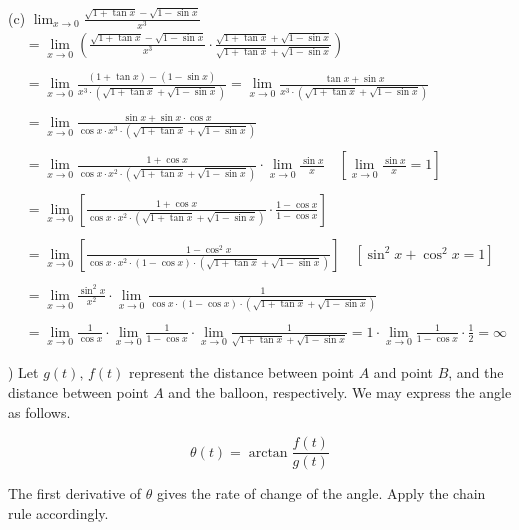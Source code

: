 \documentclass{article}
\begin{document}
\noindent (c) $\displaystyle\lim_{x\to0}\frac{\sqrt{1+\tan x}-\sqrt{1-\sin x}}{x^3}$
\begin{align*}
&=\lim_{x\to0}\left(\frac{\sqrt{1+\tan x}-\sqrt{1-\sin x}}{x^3}\cdot\frac{\sqrt{1+\tan x}+\sqrt{1-\sin x}}{\sqrt{1+\tan x}+\sqrt{1-\sin x}}\right)\\\\&=\lim_{x\to0}\frac{(1+\tan x)-(1-\sin x)}{x^3\cdot\left(\sqrt{1+\tan x}+\sqrt{1-\sin x}\right)}=\lim_{x\to0}\frac{\tan x+\sin x}{x^3\cdot\left(\sqrt{1+\tan x}+\sqrt{1-\sin x}\right)}\\\\&=\lim_{x\to0}\frac{\sin x+\sin x\cdot\cos x}{\cos x\cdot x^3\cdot\left(\sqrt{1+\tan x}+\sqrt{1-\sin x}\right)}\\\\&=\lim_{x\to0}\frac{1+\cos x}{\cos x\cdot x^2\cdot\left(\sqrt{1+\tan x}+\sqrt{1-\sin x}\right)}\cdot\lim_{x\to0}\frac{\sin x}{x}\quad\left[\lim_{x\to0}\frac{\sin x}x=1\right]\\\\&=\lim_{x\to0}\left[\frac{1+\cos x}{\cos x\cdot x^2\cdot\left(\sqrt{1+\tan x}+\sqrt{1-\sin x}\right)}\cdot\frac{1-\cos x}{1-\cos x}\right]\\\\&=\lim_{x\to0}\left[\frac{1-\cos^2x}{\cos x\cdot x^2\cdot(1-\cos x)\cdot\left(\sqrt{1+\tan x}+\sqrt{1-\sin x}\right)}\right]\quad\left[\sin^2x+\cos^2x=1\right]\\\\&=\lim_{x\to0}\frac{\sin^2x}{x^2}\cdot\lim_{x\to0}\frac1{\cos x\cdot(1-\cos x)\cdot\left(\sqrt{1+\tan x}+\sqrt{1-\sin x}\right)}\\\\&=\lim_{x\to0}\frac1{\cos x}\cdot\lim_{x\to0}\frac1{1-\cos x}\cdot\lim_{x\to0}\frac1{\sqrt{1+\tan x}+\sqrt{1-\sin x}}=1\cdot\lim_{x\to0}\frac1{1-\cos x}\cdot\frac12 =\boxed{\infty}\end{align*}

\hfill

) Let $g(t),\,f(t)$ represent the distance between point $A$ and point $B$, and the distance between point $A$ and the balloon, respectively. We may express the angle as follows.

\begin{equation*}\theta(t)=\arctan{\frac{f(t)}{g(t)}}\end{equation*}

\hfill

\noindent The first derivative of $\theta$ gives the rate of change of the angle. Apply the chain rule accordingly.
\end{document}
